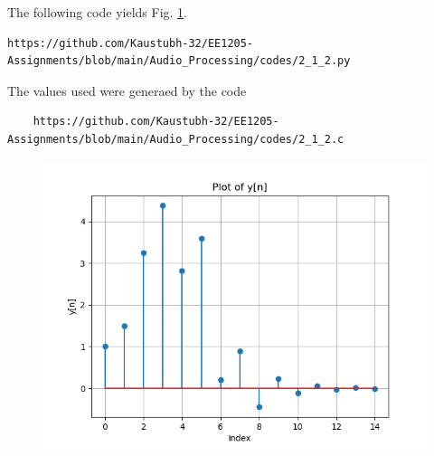 \documentclass[journal,12pt,twocolumn]{IEEEtran}
\theoremstyle{remark}
\begin{document}
\begin{enumerate}[label=\thesection.\arabic*,ref=\thesection.\theenumi]
The following code yields Fig. \ref{fig:xnyn1}.
\begin{lstlisting}
https://github.com/Kaustubh-32/EE1205-Assignments/blob/main/Audio_Processing/codes/2_1_2.py
\end{lstlisting}
The values used were generaed by the code
\begin{lstlisting}
    https://github.com/Kaustubh-32/EE1205-Assignments/blob/main/Audio_Processing/codes/2_1_2.c
\end{lstlisting}
\begin{figure}[!ht]
\begin{center}
\includegraphics[width=\columnwidth]{2_1_2.png}
\end{center}
\label{fig:xnyn1}	
\end{figure}
\end{enumerate}
\end{document}
